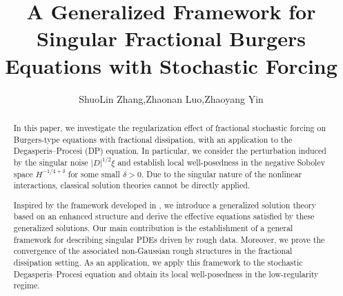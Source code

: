 \documentclass{article}
\numberwithin{equation}{section}
\begin{document}
	\author{ShuoLin Zhang,\quad Zhaonan Luo,\quad Zhaoyang Yin}
	\title{A Generalized Framework for Singular Fractional Burgers Equations with Stochastic Forcing }
	\date{}
	\maketitle
	\tableofcontents
	\begin{abstract}
		In this paper, we investigate the regularization effect of fractional stochastic forcing on Burgers-type equations with fractional dissipation, with an application to the Degasperis--Procesi (DP) equation. In particular, we consider the perturbation induced by the singular noise $|D|^{1/2}\xi$ and establish local well-posedness in the negative Sobolev space $H^{-1/4+\delta}$ for some small $\delta>0$. Due to the singular nature of the nonlinear interactions, classical solution theories cannot be directly applied.
\par Inspired by the framework developed in \cite{hairer2013solving,gubinelli2017kpz}, we introduce a generalized solution theory based on an enhanced structure and derive the effective equations satisfied by these generalized solutions. Our main contribution is the establishment of a general framework for describing singular PDEs driven by rough data. Moreover, we prove the convergence of the associated non-Gaussian rough structures in the fractional dissipation setting. As an application, we apply this framework to the stochastic Degasperis--Procesi equation and obtain its local well-posedness in the low-regularity regime.
	\end{abstract}
\end{document}
